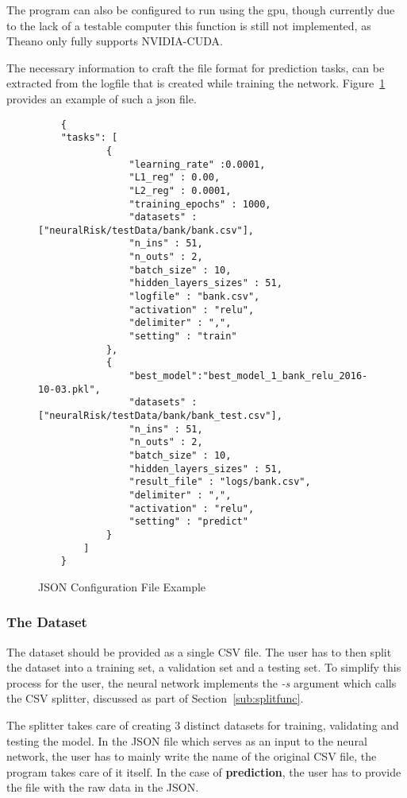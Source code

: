 \documentclass[12pt]{article}
\begin{document}
The program can also be configured to run using the \gls{gpu}, though currently due to the lack of a testable computer this function is still not implemented, as Theano only fully supports NVIDIA-CUDA\@. 

The necessary information to craft the file format for prediction tasks, can be extracted from the logfile that is created while training the network. Figure~\ref{fig:json} provides an example of such a json file.

\begin{figure}[ht]
\begin{lstlisting}
    {
    "tasks": [
            {
                "learning_rate" :0.0001,
                "L1_reg" : 0.00,
                "L2_reg" : 0.0001,
                "training_epochs" : 1000,
                "datasets" : ["neuralRisk/testData/bank/bank.csv"],
                "n_ins" : 51,
                "n_outs" : 2,
                "batch_size" : 10,
                "hidden_layers_sizes" : 51,
                "logfile" : "bank.csv",
                "activation" : "relu",
                "delimiter" : ",",
                "setting" : "train"
            },
            {
                "best_model":"best_model_1_bank_relu_2016-10-03.pkl",
                "datasets" : ["neuralRisk/testData/bank/bank_test.csv"],
                "n_ins" : 51,
                "n_outs" : 2,
                "batch_size" : 10,
                "hidden_layers_sizes" : 51,
                "result_file" : "logs/bank.csv",
                "delimiter" : ",",
                "activation" : "relu",
                "setting" : "predict"
            }
        ]
    }
    \end{lstlisting}
    \caption{JSON Configuration File Example\protect\footnotemark}
    \label{fig:json}
\end{figure}
\subsubsection{The Dataset}
\label{subsub:dataset}

The dataset should be provided as a single CSV file. The user has to then split the dataset into a training set, a validation set and a testing set. To simplify this process for the user, the neural network implements the \textit{-s} argument which calls the CSV splitter, discussed as part of Section~\ref{sub:splitfunc}. 

The splitter takes care of creating 3 distinct datasets for training, validating and testing the model. In the JSON file which serves as an input to the neural network, the user has to mainly write the name of the original CSV file, the program takes care of it itself. In the case of \textbf{prediction}, the user has to provide the file with the raw data in the JSON.
\end{document}
